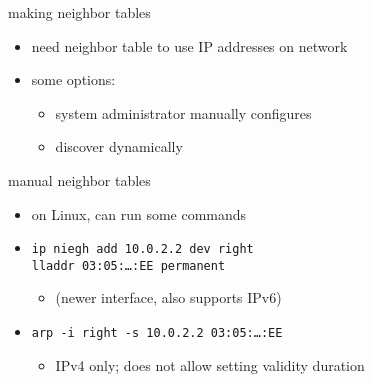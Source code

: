 \begin{frame}{making neighbor tables}
    \begin{itemize}
    \item need neighbor table to use IP addresses on network
    \vspace{.5cm}
    \item some options:
        \begin{itemize}
        \item system administrator manually configures
        \item discover dynamically
        \end{itemize}
    \end{itemize}
\end{frame}

\begin{frame}{manual neighbor tables}
\begin{itemize}
\item on Linux, can run some commands
\vspace{.5cm}
\item {\tt ip niegh add 10.0.2.2 dev right \\ \hspace{3cm}lladdr 03:05:\ldots:EE permanent}
    \begin{itemize}
    \item (newer interface, also supports IPv6)
    \end{itemize}
\item {\tt arp -i right -s 10.0.2.2 03:05:\ldots:EE}
    \begin{itemize}
    \item IPv4 only; does not allow setting validity duration
    \end{itemize}
\end{itemize}
\end{frame}
